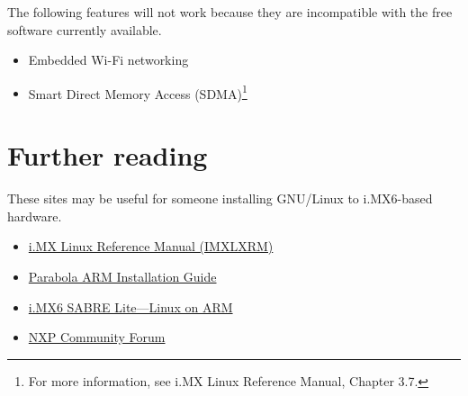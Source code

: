 \documentclass{memoir}
\begin{document}
The following features will not work because they are incompatible with the free software currently available.

\begin{itemize}
\item{Embedded Wi-Fi networking}
\item{Smart Direct Memory Access (SDMA)\footnote{For more information, see i.MX Linux Reference Manual, Chapter 3.7.}}
\end{itemize}

\section{Further reading}
These sites may be useful for someone installing GNU/Linux to i.MX6-based hardware. 

\begin{itemize}
\item{\href{https://www.nxp.com/docs/en/user-guide/IMXLUG.pdf}{i.MX Linux Reference Manual (IMXLXRM)}}
\item{\href{https://wiki.parabola.nu/ARM_Installation_Guide}{Parabola ARM Installation Guide}}
\item{\href{https://www.digikey.com/eewiki/display/linuxonarm/i.MX6+SABRE+Lite}{i.MX6 SABRE Lite---Linux on ARM}}
  \item{\href{https://community.nxp.com/}{NXP Community Forum}}
  \end{itemize}





\appendix
\end{document}
